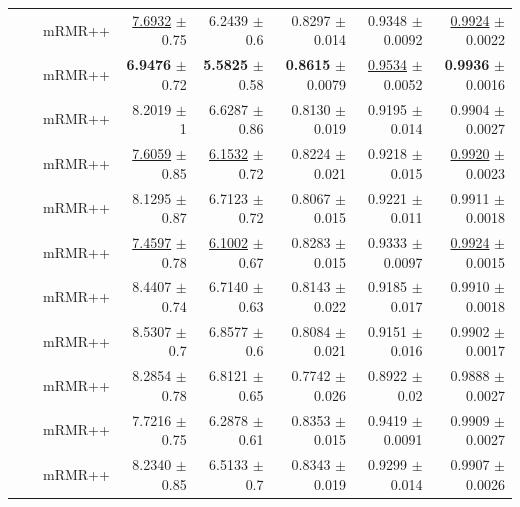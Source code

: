 \begin{longtable}{llp{}rrrrr}
 &  & mRMR++ & \underline{7.6932} {\scriptsize $\pm$ 0.75} & 6.2439 {\scriptsize $\pm$ 0.6} & 0.8297 {\scriptsize $\pm$ 0.014} & 0.9348 {\scriptsize $\pm$ 0.0092} & \underline{0.9924} {\scriptsize $\pm$ 0.0022} \\
 &  & mRMR++ & \textbf{6.9476} {\scriptsize $\pm$ 0.72} & \textbf{5.5825} {\scriptsize $\pm$ 0.58} & \textbf{0.8615} {\scriptsize $\pm$ 0.0079} & \underline{0.9534} {\scriptsize $\pm$ 0.0052} & \textbf{0.9936} {\scriptsize $\pm$ 0.0016} \\
 &  & mRMR++ & 8.2019 {\scriptsize $\pm$ 1} & 6.6287 {\scriptsize $\pm$ 0.86} & 0.8130 {\scriptsize $\pm$ 0.019} & 0.9195 {\scriptsize $\pm$ 0.014} & 0.9904 {\scriptsize $\pm$ 0.0027} \\
 &  & mRMR++ & \underline{7.6059} {\scriptsize $\pm$ 0.85} & \underline{6.1532} {\scriptsize $\pm$ 0.72} & 0.8224 {\scriptsize $\pm$ 0.021} & 0.9218 {\scriptsize $\pm$ 0.015} & \underline{0.9920} {\scriptsize $\pm$ 0.0023} \\
 &  & mRMR++ & 8.1295 {\scriptsize $\pm$ 0.87} & 6.7123 {\scriptsize $\pm$ 0.72} & 0.8067 {\scriptsize $\pm$ 0.015} & 0.9221 {\scriptsize $\pm$ 0.011} & 0.9911 {\scriptsize $\pm$ 0.0018} \\
 &  & mRMR++ & \underline{7.4597} {\scriptsize $\pm$ 0.78} & \underline{6.1002} {\scriptsize $\pm$ 0.67} & 0.8283 {\scriptsize $\pm$ 0.015} & 0.9333 {\scriptsize $\pm$ 0.0097} & \underline{0.9924} {\scriptsize $\pm$ 0.0015} \\
 &  & mRMR++ & 8.4407 {\scriptsize $\pm$ 0.74} & 6.7140 {\scriptsize $\pm$ 0.63} & 0.8143 {\scriptsize $\pm$ 0.022} & 0.9185 {\scriptsize $\pm$ 0.017} & 0.9910 {\scriptsize $\pm$ 0.0018} \\
 &  & mRMR++ & 8.5307 {\scriptsize $\pm$ 0.7} & 6.8577 {\scriptsize $\pm$ 0.6} & 0.8084 {\scriptsize $\pm$ 0.021} & 0.9151 {\scriptsize $\pm$ 0.016} & 0.9902 {\scriptsize $\pm$ 0.0017} \\
 &  & mRMR++ & 8.2854 {\scriptsize $\pm$ 0.78} & 6.8121 {\scriptsize $\pm$ 0.65} & 0.7742 {\scriptsize $\pm$ 0.026} & 0.8922 {\scriptsize $\pm$ 0.02} & 0.9888 {\scriptsize $\pm$ 0.0027} \\
 &  & mRMR++ & 7.7216 {\scriptsize $\pm$ 0.75} & 6.2878 {\scriptsize $\pm$ 0.61} & 0.8353 {\scriptsize $\pm$ 0.015} & 0.9419 {\scriptsize $\pm$ 0.0091} & 0.9909 {\scriptsize $\pm$ 0.0027} \\
 &  & mRMR++ & 8.2340 {\scriptsize $\pm$ 0.85} & 6.5133 {\scriptsize $\pm$ 0.7} & 0.8343 {\scriptsize $\pm$ 0.019} & 0.9299 {\scriptsize $\pm$ 0.014} & 0.9907 {\scriptsize $\pm$ 0.0026} \\

\end{longtable}
